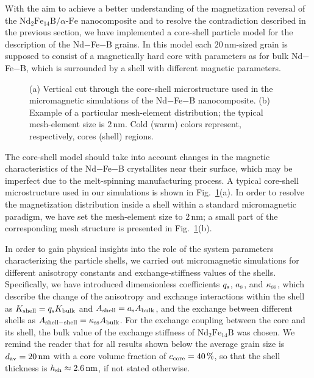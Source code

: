 \documentclass[prm,twocolumn,showkeys,preprintnumbers,amsmath,amssymb,superscriptaddress,aps,10pt]{revtex4-1}
\begin{document}
With the aim to achieve a better understanding of the magnetization reversal of the $\mathrm{Nd}_2\mathrm{Fe}_{14}\mathrm{B}/\alpha$-$\mathrm{Fe}$ nanocomposite and to resolve the contradiction described in the previous section, we have implemented a core-shell particle model for the description of the Nd$-$Fe$-$B grains. In this model each $20 \, \mathrm{nm}$-sized grain is supposed to consist of a magnetically hard core with parameters as for bulk Nd$-$Fe$-$B, which is surrounded by a shell with different magnetic parameters. 
\begin{figure}[htb]
\centering
{}
\caption{(a) Vertical cut through the core-shell microstructure used in the micromagnetic simulations of the Nd$-$Fe$-$B nanocomposite. (b) Example of a particular mesh-element distribution; the typical mesh-element size is $2 \, \mathrm{nm}$. Cold (warm) colors represent, respectively, cores (shell) regions.}
\label{coreshell3D}
\end{figure}
The core-shell model should take into account changes in the magnetic characteristics of the Nd$-$Fe$-$B crystallites near their surface, which may be imperfect due to the melt-spinning manufacturing process. A typical core-shell microstructure used in our simulations is shown in Fig.~\ref{coreshell3D}(a). In order to resolve the magnetization distribution inside a shell within a standard micromagnetic paradigm, we have set the mesh-element size to $2 \, \mathrm{nm}$; a small part of the corresponding mesh structure is presented in Fig.~\ref{coreshell3D}(b).

In order to gain physical insights into the role of the system parameters characterizing the particle shells, we carried out micromagnetic simulations for different anisotropy constants and exchange-stiffness values of the shells. Specifically, we have introduced dimensionless coefficients $q_{\rm s}$, $a_{\rm s}$, and $\kappa_{\rm ss}$, which describe the change of the anisotropy and exchange interactions within the shell as $K_{\rm shell} = q_{\rm s} K_{\rm bulk}$ and $A_{\rm shell} = a_{\rm s} A_{\rm bulk}$, and the exchange between different shells as $A_{\rm{shell-shell}} = \kappa_{\rm ss} A_{\rm bulk}$. For the exchange coupling between the core and its shell, the bulk value of the exchange stiffness of $\mathrm{Nd}_2\mathrm{Fe}_{14}\mathrm{B}$ was chosen. We remind the reader that for all results shown below the average grain size is $d_{\rm av} = 20 \, \mathrm{nm}$ with a core volume fraction of $c_{\rm core} = 40 \, \%$, so that the shell thickness is $h_{\rm sh} \approx 2.6 \, \mathrm{nm}$, if not stated otherwise. 
\end{document}
